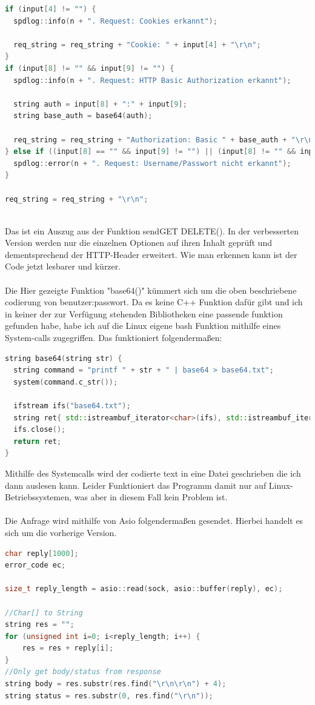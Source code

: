 \documentclass{article}
\begin{document}
\begin{lstlisting}[language=C++]
if (input[4] != "") {
  spdlog::info(n + ". Request: Cookies erkannt");

  req_string = req_string + "Cookie: " + input[4] + "\r\n";
} 
if (input[8] != "" && input[9] != "") {
  spdlog::info(n + ". Request: HTTP Basic Authorization erkannt");

  string auth = input[8] + ":" + input[9];
  string base_auth = base64(auth);

  req_string = req_string + "Authorization: Basic " + base_auth + "\r\n";
} else if ((input[8] == "" && input[9] != "") || (input[8] != "" && input[9] == "")) {
  spdlog::error(n + ". Request: Username/Passwort nicht erkannt");
}
        
req_string = req_string + "\r\n";
\end{lstlisting}
\\
Das ist ein Auszug aus der Funktion send\textunderscore GET \textunderscore DELETE(). In der verbesserten Version werden nur die einzelnen Optionen auf ihren Inhalt geprüft und dementsprechend der HTTP-Header erweitert. Wie man erkennen kann ist der Code jetzt lesbarer und kürzer. 
\\
\\
Die Hier gezeigte Funktion "base64()" kümmert sich um die oben beschriebene codierung von benutzer:passwort. 
Da es keine C++ Funktion dafür gibt und ich in keiner der zur Verfügung stehenden Bibliotheken eine passende funktion gefunden habe, habe ich auf die Linux eigene bash Funktion mithilfe eines System-calls zugegriffen. Das funktioniert folgendermaßen:
\begin{lstlisting}[language=C++]
string base64(string str) {
  string command = "printf " + str + " | base64 > base64.txt";
  system(command.c_str());

  ifstream ifs("base64.txt");
  string ret{ std::istreambuf_iterator<char>(ifs), std::istreambuf_iterator<char>() };
  ifs.close();
  return ret;
}
\end{lstlisting}
Mithilfe des Systemcalls wird der codierte text in eine Datei geschrieben die ich dann auslesen kann. Leider Funktioniert das Programm damit nur auf Linux-Betriebssystemen, was aber in diesem Fall kein Problem ist. 
\\
\\
Die Anfrage wird mithilfe von Asio folgendermaßen gesendet. Hierbei handelt es sich um die vorherige Version. 
\begin{lstlisting}[language=C++]
char reply[1000];
error_code ec;

size_t reply_length = asio::read(sock, asio::buffer(reply), ec);

//Char[] to String
string res = "";
for (unsigned int i=0; i<reply_length; i++) {
    res = res + reply[i];
}
//Only get body/status from response
string body = res.substr(res.find("\r\n\r\n") + 4);
string status = res.substr(0, res.find("\r\n"));
\end{lstlisting}
\end{document}
